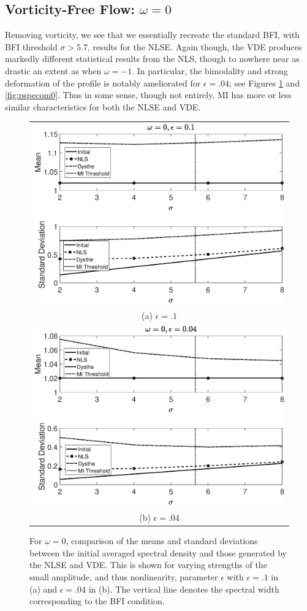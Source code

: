 \documentclass[a4paper,11pt]{article}
\begin{document}
\subsection*{Vorticity-Free Flow: $\omega = 0$}

Removing vorticity, we see that we essentially recreate the standard BFI, with BFI threshold $\sigma > 5.7$, results for the NLSE.  Again though, the VDE produces markedly different statistical results from the NLS, though to nowhere near as drastic an extent as when $\omega=-1$.  In particular, the bimodality and strong deformation of the profile is notably ameliorated for $\epsilon=.04$; see Figures \ref{fig:meanstdom0} and \ref{fig:pspecom0}.  Thus in some sense, though not entirely, MI has more or less similar characteristics for both the NLSE and VDE. 

\begin{figure}[!ht]
\centering
\begin{tabular}{c}
\includegraphics[width=.85\textwidth]{omega0_ep0pt1}\\
(a) $\epsilon=.1$ \\
\includegraphics[width=.85\textwidth]{omega0_ep0pt04}\\
(b) $\epsilon=.04$
\end{tabular}
\caption{For $\omega=0$, comparison of the means and standard deviations between the initial averaged spectral density and those generated by the NLSE and VDE.  This is shown for varying strengths of the small amplitude, and thus nonlinearity, parameter $\epsilon$ with $\epsilon=.1$ in (a) and $\epsilon=.04$ in (b).  The vertical line denotes the spectral width corresponding to the BFI condition.}
\label{fig:meanstdom0}
\end{figure}
\end{document}
